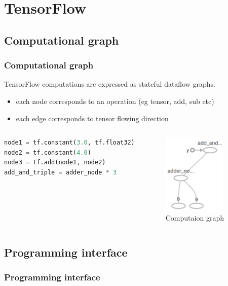 
\section{TensorFlow}\label{sec:TF}

\subsection{Computational graph}

\begin{frame}[fragile]
  \MyLogo
  \frametitle{Computational graph}  
TensorFlow computations are expressed as stateful dataflow graphs.
\begin{itemize}
\item each node corresponds to an operation (eg tensor, add, sub etc)
\item each edge corresponds to tensor flowing direction
\end{itemize}
%  
\begin{columns}
\begin{lstlisting}[language=python]
node1 = tf.constant(3.0, tf.float32)
node2 = tf.constant(4.0)
node3 = tf.add(node1, node2)
add_and_triple = adder_node * 3
\end{lstlisting}
%
%
\begin{figure}[htbp] 
   \includegraphics[height=1.5in]{figures/compgraph.png} 
\caption{Computaion graph}
\end{figure}
\end{columns}
\end{frame}

\subsection{Programming interface}

\begin{frame}
  \MyLogo
  \frametitle{Programming interface}  

\end{frame}

